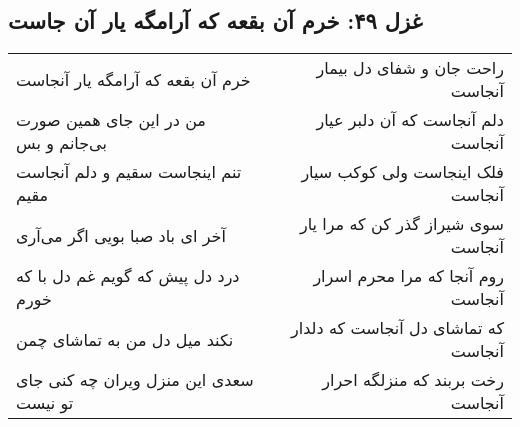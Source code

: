 \begin{center}
\section*{غزل ۴۹: خرم آن بقعه که آرامگه یار آن جاست}
\label{sec:049}
\begin{longtable}{l p{0.5cm} r}
خرم آن بقعه که آرامگه یار آنجاست
&&
راحت جان و شفای دل بیمار آنجاست
\\
من در این جای همین صورت بی‌جانم و بس
&&
دلم آنجاست که آن دلبر عیار آنجاست
\\
تنم اینجاست سقیم و دلم آنجاست مقیم
&&
فلک اینجاست ولی کوکب سیار آنجاست
\\
آخر ای باد صبا بویی اگر می‌آری
&&
سوی شیراز گذر کن که مرا یار آنجاست
\\
درد دل پیش که گویم غم دل با که خورم
&&
روم آنجا که مرا محرم اسرار آنجاست
\\
نکند میل دل من به تماشای چمن
&&
که تماشای دل آنجاست که دلدار آنجاست
\\
سعدی این منزل ویران چه کنی جای تو نیست
&&
رخت بربند که منزلگه احرار آنجاست
\\
\end{longtable}
\end{center}
